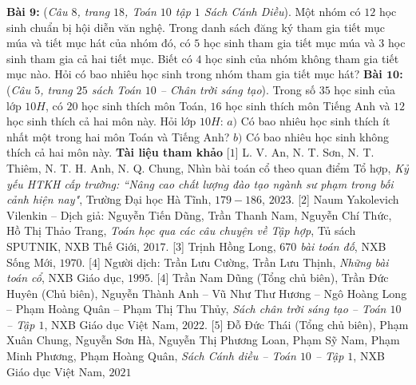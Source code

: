 \begin{multicols}{2}
	\vskip 0.1cm
	\textbf{\color{diendantoanhoc}Bài $\pmb9$:} (\textit{Câu $8$, trang $18$, Toán $10$ tập $1$ Sách Cánh Diều}). Một nhóm có $12$ học sinh chuẩn bị hội diễn văn nghệ. Trong danh sách đăng ký tham gia tiết mục múa và tiết mục hát của nhóm đó, có $5$ học sinh tham gia tiết mục múa và $3$ học sinh tham gia cả hai tiết mục. Biết có $4$ học sinh của nhóm không tham gia tiết mục nào. Hỏi có bao nhiêu học sinh trong nhóm tham gia tiết mục hát? 
	\vskip 0.1cm
	\textbf{\color{diendantoanhoc}Bài $\pmb{10}$:} (\textit{Câu $5$, trang $25$ sách Toán $10$ -- Chân trời sáng tạo}). Trong số $35$ học sinh của lớp $10H$, có $20$ học sinh thích môn Toán, $16$ học sinh thích môn Tiếng Anh và $12$ học
	sinh thích cả hai môn này. Hỏi lớp $10H$:
	\vskip 0.1cm
	$a)$ Có bao nhiêu học sinh thích ít nhất một
	trong hai môn Toán và Tiếng Anh?
	\vskip 0.1cm
	$b)$ Có bao nhiêu học sinh không thích cả hai môn này.
	\vskip 0.1cm
	\textbf{\color{diendantoanhoc}Tài liệu tham khảo}
	\vskip 0.1cm
	[$1$]	L. V. An, N. T. Sơn, N. T. Thiêm, N. T. H. Anh, N. Q. Chung, Nhìn bài toán cổ theo quan điểm Tổ hợp, \textit{Kỷ yếu HTKH cấp trường: ``Nâng cao chất lượng đào tạo ngành sư phạm trong bối cảnh hiện nay"}, Trường Đại học Hà Tĩnh,  $179 - 186$, $2023$.
	\vskip 0.1cm
	[$2$] Naum Yakolevich Vilenkin -- Dịch giả: Nguyễn Tiến Dũng, Trần Thanh Nam, Nguyễn Chí Thức, Hồ Thị Thảo Trang, \textit{Toán học qua các câu chuyện về Tập hợp}, Tủ sách SPUTNIK, NXB Thế Giới, $2017$.
	\vskip 0.1cm
	[$3$] Trịnh Hồng Long, \textit{$670$ bài toán đố}, NXB Sống Mới, $1970$.
	\vskip 0.1cm
	[$4$] Người dịch: Trần Lưu Cường, Trần Lưu Thịnh, \textit{Những bài toán cổ}, NXB Giáo dục, $1995$.
	\vskip 0.1cm
	[$4$] Trần Nam Dũng (Tổng chủ biên), Trần Đức Huyên (Chủ biên), Nguyễn Thành Anh -- Vũ Như Thư Hương -- Ngô Hoàng Long -- Phạm Hoàng Quân -- Phạm Thị Thu Thủy, \textit{Sách chân trời sáng tạo -- Toán $10$ -- Tập $1$}, NXB Giáo dục Việt Nam, $2022$.
	\vskip 0.1cm
	[$5$]	Đỗ Đức Thái (Tổng chủ biên), Phạm Xuân Chung, Nguyễn Sơn Hà, Nguyễn Thị Phương Loan, Phạm Sỹ Nam, Phạm Minh Phương, Phạm Hoàng Quân, \textit{Sách Cánh diều -- Toán $10$ -- Tập $1$}, NXB Giáo dục Việt Nam, $2021$	
\end{multicols}